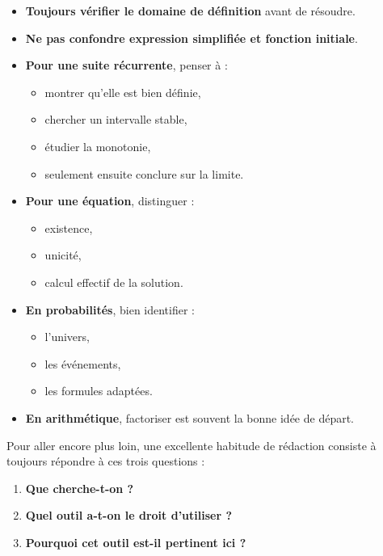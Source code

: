 \documentclass[11pt,a4paper]{article}
\begin{document}
\begin{itemize}
    \item \textbf{Toujours vérifier le domaine de définition} avant de résoudre.
    \item \textbf{Ne pas confondre expression simplifiée et fonction initiale}.
    \item \textbf{Pour une suite récurrente}, penser à :
    \begin{itemize}
        \item montrer qu'elle est bien définie,
        \item chercher un intervalle stable,
        \item étudier la monotonie,
        \item seulement ensuite conclure sur la limite.
    \end{itemize}
    \item \textbf{Pour une équation}, distinguer :
    \begin{itemize}
        \item existence,
        \item unicité,
        \item calcul effectif de la solution.
    \end{itemize}
    \item \textbf{En probabilités}, bien identifier :
    \begin{itemize}
        \item l'univers,
        \item les événements,
        \item les formules adaptées.
    \end{itemize}
    \item \textbf{En arithmétique}, factoriser est souvent la bonne idée de départ.
\end{itemize}

\vspace{0.5em}

\begin{methodebox}
Pour aller encore plus loin, une excellente habitude de rédaction consiste à toujours répondre à ces trois questions :
\begin{enumerate}
    \item \textbf{Que cherche-t-on ?}
    \item \textbf{Quel outil a-t-on le droit d'utiliser ?}
    \item \textbf{Pourquoi cet outil est-il pertinent ici ?}
\end{enumerate}
\end{methodebox}
\end{document}
